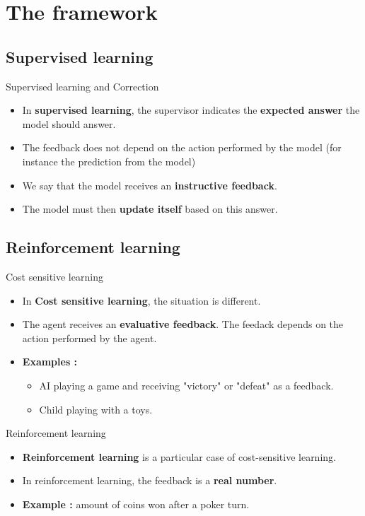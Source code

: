 \documentclass[usenames,dvipsnames,french]{beamer}
\begin{document}
\section{The framework}%
\label{sec:j}

\subsection{Supervised learning}%
\label{sub:supervised_learning}


\begin{frame}{Supervised learning and Correction}
    \begin{itemize}
        \item In \textbf{{supervised learning}}, the supervisor indicates the \textbf{{expected answer}} the model should answer.
	\item The feedback does not depend on the action performed by the model (for instance the prediction from the model)
	\item We say that the model receives an \textbf{{instructive feedback}}.
	\item The model must then \textbf{{update itself}}  based on this answer.
    \end{itemize}
\end{frame}

\subsection{Reinforcement learning}%
\label{sub:reinforcement_learning}

\begin{frame}{Cost sensitive learning}
   \begin{itemize}
       \item In \textbf{{Cost sensitive learning}}, the situation is different. 
	\item The agent receives an \textbf{{evaluative feedback}}. The feedack depends on the action performed by the agent.
	\item \textbf{{Examples : }}
	    \begin{itemize}
	    \item AI playing a game and receiving "victory" or "defeat" as a feedback.
	    \item Child playing with a toys.
	\end{itemize} 
   \end{itemize} 
\end{frame}

\begin{frame}{Reinforcement learning}
   \begin{itemize}
       \item \textbf{{Reinforcement learning}} is a particular case of cost-sensitive learning.
	\item In reinforcement learning, the feedback is a \textbf{{real number}}.
	\item \textbf{{Example : }} amount of coins won after a poker turn.
   \end{itemize} 
\end{frame}
\end{document}
